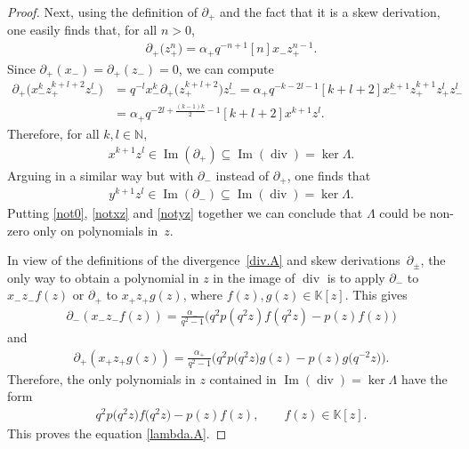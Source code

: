 \documentclass[pdftex]{sigma}
\numberwithin{equation}{section}
\begin{document}
\begin{proof}
Next, using the def\/inition of $\partial_+$ and the fact that it is a skew derivation, one easily f\/inds that, for all $n>0$,
\begin{gather*}
\partial_+\big(z_+^n\big) = \alpha_+ q^{-n+1} [n] x_-z_+^{n-1}.
\end{gather*}
Since $\partial_+(x_-) = \partial_+(z_-) = 0$, we can compute
\begin{align*}
\partial_+\big(x_-^kz_{+}^{k+l+2}z_-^l\big) &= q^{-l} x_-^k\partial_+\big(z_{+}^{k+l+2}\big)z_-^l = \alpha_+
q^{-k-2l-1}[k+l+2] x_-^{k+1}z_+^{k+1} z_+^lz_-^l\\
&= \alpha_+ q^{-2l +\frac{(k-1)k}2 - 1}[k+l+2] x^{k+1} z^l.
\end{align*}
Therefore, for all $k,l\in {\mathbb N}$,
\begin{gather}\label{notxz}
x^{k+1} z^l \in \operatorname{Im} (\partial_+ )\subseteq \operatorname{Im} (\operatorname{div} ) = \ker \Lambda.
\end{gather}
Arguing in a similar way but with $\partial_-$ instead of $\partial_+$, one f\/inds that
\begin{gather}\label{notyz}
y^{k+1} z^l \in \operatorname{Im}\left(\partial_-\right)\subseteq \operatorname{Im}\left(\operatorname{div}\right) = \ker \Lambda.
\end{gather}
Putting \eqref{not0}, \eqref{notxz} and \eqref{notyz} together we can conclude that $\Lambda$ could be non-zero only on polynomials in~$z$.

In view of the def\/initions of the divergence~\eqref{div.A} and skew derivations~$\partial_\pm$, the only way to obtain a polynomial in $z$ in the image of $\operatorname{div}$ is to apply $\partial_-$ to $x_-z_- f(z)$ or $\partial_+$ to $x_+z_+ g(z)$, where $f(z),g(z)\in {\mathbb K}[z]$. This gives
\begin{gather*}
\partial_-(x_-z_- f(z)) = \frac{\alpha_-}{q^2 -1}\big(q^2 p(q^2 z)f(q^2 z) - p(z)f(z)\big)
\end{gather*}
and
\begin{gather*}
\partial_+(x_+z_+ g(z)) = \frac{\alpha_+}{q^2 -1}\big(q^2 p\big(q^2 z\big)g(z) - p(z)g\big(q^{-2}z\big)\big).
\end{gather*}
Therefore, the only polynomials in $z$ contained in $\operatorname{Im}(\operatorname{div}) = \ker \Lambda$ have the form
\begin{gather*}%
q^2 p\big(q^2 z\big)f\big(q^2 z\big) - p(z)f(z), \qquad f(z)\in {\mathbb K}[z].
\end{gather*}
This proves the equation \eqref{lambda.A}.


\end{proof}
\end{document}
